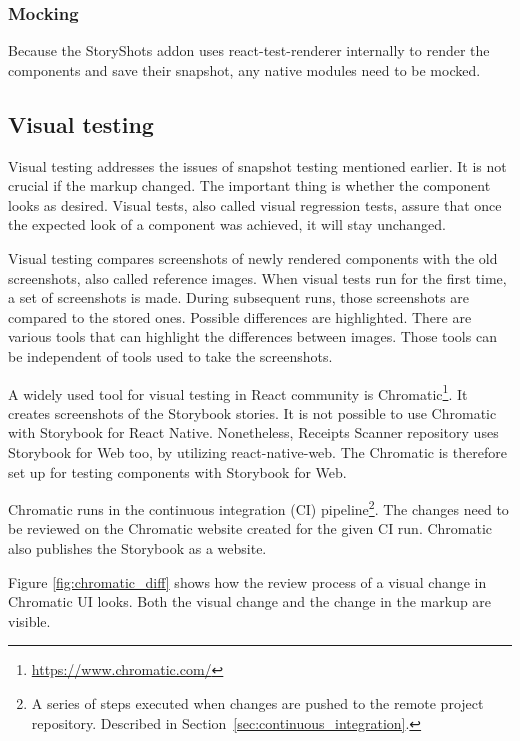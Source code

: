 \documentclass[
  digital, %
  table,   %
  oneside, %
  lof,     %
  lot,     %
]{fithesis3}
\begin{document}
\subsubsection{Mocking}
Because the StoryShots addon uses react-test-renderer internally to render the components and save their snapshot, any native modules need to be mocked.

\subsection{Visual testing}
\label{sec:visual_testing}
Visual testing addresses the issues of snapshot testing mentioned earlier. It is not crucial if the markup changed. The important thing is whether the component looks as desired. Visual tests, also called visual regression tests, assure that once the expected look of a component was achieved, it will stay unchanged.

Visual testing compares screenshots of newly rendered components with the old screenshots, also called reference images.
When visual tests run for the first time, a set of screenshots is made. During subsequent runs, those screenshots are compared to the stored ones. Possible differences are highlighted. There are various tools that can highlight the differences between images. Those tools can be independent of tools used to take the screenshots.

A widely used tool for visual testing in React community is Chromatic\footnote{\url{https://www.chromatic.com/}}. It creates screenshots of the Storybook stories. It is not possible to use Chromatic with Storybook for React Native. Nonetheless, Receipts Scanner repository uses Storybook for Web too, by utilizing react-native-web. The Chromatic is therefore set up for testing components with Storybook for Web.

Chromatic runs in the continuous integration (CI) pipeline\footnote{A series of steps executed when changes are pushed to the remote project repository. Described in Section~\ref{sec:continuous_integration}.}. The changes need to be reviewed on the Chromatic website created for the given CI run. Chromatic also publishes the Storybook as a website.

Figure \ref{fig:chromatic_diff} shows how the review process of a visual change in Chromatic UI looks. Both the visual change and the change in the markup are visible.
\end{document}
